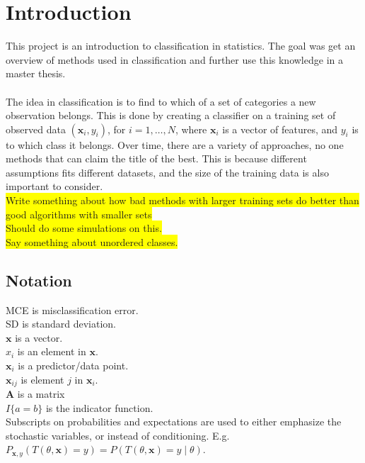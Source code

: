 \section{Introduction}
\label{sec:Introduction}
This project is an introduction to classification in statistics. The goal was get an overview of methods used in classification and further use this knowledge in a master thesis. \\
\\
The idea in classification is to find to which of a set of categories a new observation belongs. This is done by creating a classifier on a training set of observed data $(\mathbf{x}_i, y_i)$, for $i = 1, \ldots, N$, where $\mathbf{x}_i$ is a vector of features, and $y_i$ is to which class it belongs. Over time, there are a variety of approaches, no one methods that can claim the title of the best. This is because different assumptions fits different datasets, and the size of the training data is also important to consider. \\
\colorbox{yellow}{Write something about how bad methods with larger training sets do better than good algorithms with smaller sets}\\
\colorbox{yellow}{Should do some simulations on this.}\\
\colorbox{yellow}{Say something about unordered classes.}


\subsection{Notation}
\label{sub:Notation}
MCE is misclassification error. \\
SD is standard deviation. \\
$\mathbf{x}$ is a vector. \\
$x_i$ is an element in $\mathbf{x}$. \\
$\mathbf{x}_i$ is a predictor/data point.  \\
$\mathbf{x}_{ij}$ is element $j$ in $\mathbf{x}_i$. \\
$\mathbf{A}$ is a matrix \\
$I\{a = b\}$ is the indicator function.\\
Subscripts on probabilities and expectations are used to either emphasize the stochastic variables, or instead of conditioning. 
E.g. $P_{\mathbf{x}, y}(T(\theta, \mathbf{x}) = y) = P(T(\theta, \mathbf{x}) = y \mid \theta)$.

